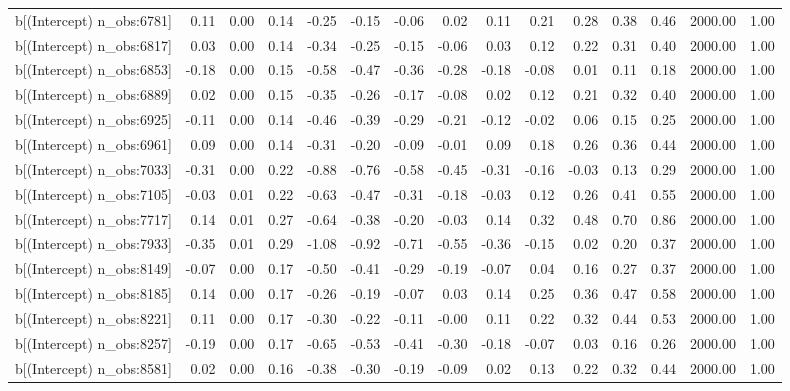 \begin{table}[ht]
\begin{tabular}{rrrrrrrrrrrrrrr}
  b[(Intercept) n\_obs:6781] & 0.11 & 0.00 & 0.14 & -0.25 & -0.15 & -0.06 & 0.02 & 0.11 & 0.21 & 0.28 & 0.38 & 0.46 & 2000.00 & 1.00 \\ 
  b[(Intercept) n\_obs:6817] & 0.03 & 0.00 & 0.14 & -0.34 & -0.25 & -0.15 & -0.06 & 0.03 & 0.12 & 0.22 & 0.31 & 0.40 & 2000.00 & 1.00 \\ 
  b[(Intercept) n\_obs:6853] & -0.18 & 0.00 & 0.15 & -0.58 & -0.47 & -0.36 & -0.28 & -0.18 & -0.08 & 0.01 & 0.11 & 0.18 & 2000.00 & 1.00 \\ 
  b[(Intercept) n\_obs:6889] & 0.02 & 0.00 & 0.15 & -0.35 & -0.26 & -0.17 & -0.08 & 0.02 & 0.12 & 0.21 & 0.32 & 0.40 & 2000.00 & 1.00 \\ 
  b[(Intercept) n\_obs:6925] & -0.11 & 0.00 & 0.14 & -0.46 & -0.39 & -0.29 & -0.21 & -0.12 & -0.02 & 0.06 & 0.15 & 0.25 & 2000.00 & 1.00 \\ 
  b[(Intercept) n\_obs:6961] & 0.09 & 0.00 & 0.14 & -0.31 & -0.20 & -0.09 & -0.01 & 0.09 & 0.18 & 0.26 & 0.36 & 0.44 & 2000.00 & 1.00 \\ 
  b[(Intercept) n\_obs:7033] & -0.31 & 0.00 & 0.22 & -0.88 & -0.76 & -0.58 & -0.45 & -0.31 & -0.16 & -0.03 & 0.13 & 0.29 & 2000.00 & 1.00 \\ 
  b[(Intercept) n\_obs:7105] & -0.03 & 0.01 & 0.22 & -0.63 & -0.47 & -0.31 & -0.18 & -0.03 & 0.12 & 0.26 & 0.41 & 0.55 & 2000.00 & 1.00 \\ 
  b[(Intercept) n\_obs:7717] & 0.14 & 0.01 & 0.27 & -0.64 & -0.38 & -0.20 & -0.03 & 0.14 & 0.32 & 0.48 & 0.70 & 0.86 & 2000.00 & 1.00 \\ 
  b[(Intercept) n\_obs:7933] & -0.35 & 0.01 & 0.29 & -1.08 & -0.92 & -0.71 & -0.55 & -0.36 & -0.15 & 0.02 & 0.20 & 0.37 & 2000.00 & 1.00 \\ 
  b[(Intercept) n\_obs:8149] & -0.07 & 0.00 & 0.17 & -0.50 & -0.41 & -0.29 & -0.19 & -0.07 & 0.04 & 0.16 & 0.27 & 0.37 & 2000.00 & 1.00 \\ 
  b[(Intercept) n\_obs:8185] & 0.14 & 0.00 & 0.17 & -0.26 & -0.19 & -0.07 & 0.03 & 0.14 & 0.25 & 0.36 & 0.47 & 0.58 & 2000.00 & 1.00 \\ 
  b[(Intercept) n\_obs:8221] & 0.11 & 0.00 & 0.17 & -0.30 & -0.22 & -0.11 & -0.00 & 0.11 & 0.22 & 0.32 & 0.44 & 0.53 & 2000.00 & 1.00 \\ 
  b[(Intercept) n\_obs:8257] & -0.19 & 0.00 & 0.17 & -0.65 & -0.53 & -0.41 & -0.30 & -0.18 & -0.07 & 0.03 & 0.16 & 0.26 & 2000.00 & 1.00 \\ 
  b[(Intercept) n\_obs:8581] & 0.02 & 0.00 & 0.16 & -0.38 & -0.30 & -0.19 & -0.09 & 0.02 & 0.13 & 0.22 & 0.32 & 0.44 & 2000.00 & 1.00 \\ 

\end{tabular}
\end{table}
